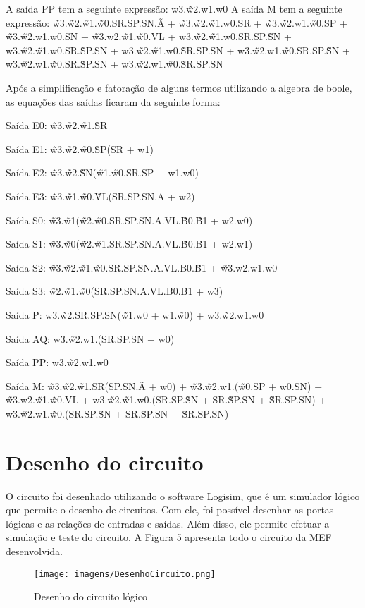 A saída PP tem a seguinte expressão: w3.\~w2.w1.w0								
A saída M tem a seguinte expressão:	\~w3.\~w2.\~w1.\~w0.SR.SP.SN.\~A + \~w3.\~w2.\~w1.w0.SR + \~w3.\~w2.w1.\~w0.SP + \~w3.\~w2.w1.w0.SN + \~w3.w2.\~w1.\~w0.VL + w3.\~w2.\~w1.w0.SR.SP.\~SN + w3.\~w2.\~w1.w0.SR.\~SP.SN + w3.\~w2.\~w1.w0.\~SR.SP.SN + w3.\~w2.w1.\~w0.SR.SP.\~SN + w3.\~w2.w1.\~w0.SR.\~SP.SN + w3.\~w2.w1.\~w0.\~SR.SP.SN								

Após a simplificação e fatoração de alguns termos utilizando a algebra de boole, as equações das saídas ficaram da seguinte forma:

Saída E0: \~w3.\~w2.\~w1.\~SR

Saída E1: \~w3.\~w2.\~w0.\~SP(SR + w1)

Saída E2: \~w3.\~w2.\~SN(\~w1.\~w0.SR.SP + w1.w0)

Saída E3: \~w3.\~w1.\~w0.\~VL(SR.SP.SN.A + w2)

Saída S0: \~w3.\~w1(\~w2.\~w0.SR.SP.SN.A.VL.\~B0.\~B1 + w2.w0)

Saída S1: \~w3.\~w0(\~w2.\~w1.SR.SP.SN.A.VL.\~B0.B1 + w2.w1)

Saída S2: \~w3.\~w2.\~w1.\~w0.SR.SP.SN.A.VL.B0.\~B1 + \~w3.w2.w1.w0

Saída S3: \~w2.\~w1.\~w0(SR.SP.SN.A.VL.B0.B1 + w3)

Saída P: w3.\~w2.SR.SP.SN(\~w1.w0 + w1.\~w0) + w3.\~w2.w1.w0

Saída AQ: w3.\~w2.w1.(SR.SP.SN + w0)

Saída PP: w3.\~w2.w1.w0

Saída M: \~w3.\~w2.\~w1.SR(SP.SN.\~A + w0) + \~w3.\~w2.w1.(\~w0.SP + w0.SN) + \~w3.w2.\~w1.\~w0.VL + w3.\~w2.\~w1.w0.(SR.SP.\~SN + SR.\~SP.SN + \~SR.SP.SN) + w3.\~w2.w1.\~w0.(SR.SP.\~SN + SR.\~SP.SN + \~SR.SP.SN)

\section{Desenho do circuito}

O circuito foi desenhado utilizando o software Logisim, que é um simulador lógico que permite o desenho de circuitos. Com ele, foi possível desenhar as portas lógicas e as relações de entradas e saídas. Além disso, ele permite efetuar a simulação e teste do circuito. A Figura 5 apresenta todo o circuito da MEF desenvolvida.

\begin{figure}[!h]
    \centering
    \texttt{[image: imagens/DesenhoCircuito.png]}
    \caption{Desenho do circuito lógico}
    \label{fig:desenhoCircuito}
\end{figure}

